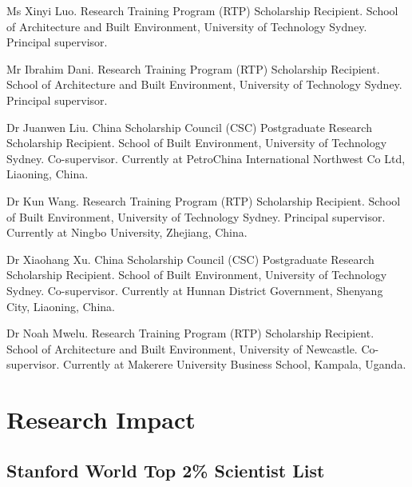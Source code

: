 \documentclass[11pt,a4paper]{report} %
\begin{document}
    \begin{tablist}

        \item[Ongoing] \tab{}Ms Xinyi Luo. Research Training Program (RTP) Scholarship Recipient. School of Architecture and Built Environment, University of Technology Sydney. Principal supervisor.

        \item[Ongoing] \tab{}Mr Ibrahim Dani. Research Training Program (RTP) Scholarship Recipient. School of Architecture and Built Environment, University of Technology Sydney. Principal supervisor.

        \item[2024] \tab{}Dr Juanwen Liu. China Scholarship Council (CSC) Postgraduate Research Scholarship Recipient. School of Built Environment, University of Technology Sydney. Co-supervisor. Currently at PetroChina International Northwest Co Ltd, Liaoning, China.

        \item[2023] \tab{}Dr Kun Wang. Research Training Program (RTP) Scholarship Recipient. School of Built Environment, University of Technology Sydney. Principal supervisor. Currently at Ningbo University, Zhejiang, China.

        \item[2022] \tab{}Dr Xiaohang Xu. China Scholarship Council (CSC) Postgraduate Research Scholarship Recipient. School of Built Environment, University of Technology Sydney. Co-supervisor. Currently at Hunnan District Government, Shenyang City, Liaoning, China.

        \item[2020] \tab{}Dr Noah Mwelu. Research Training Program (RTP) Scholarship Recipient. School of Architecture and Built Environment, University of Newcastle. Co-supervisor. Currently at Makerere University Business School, Kampala, Uganda.

    \end{tablist}



    \section*{Research Impact}

    \subsection*{Stanford World Top 2\% Scientist List}
\end{document}
